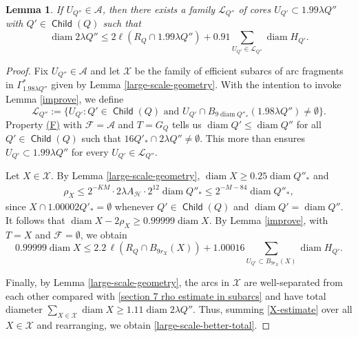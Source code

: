 \documentclass[12pt]{amsart}
\numberwithin{equation}{section}
\theoremstyle{plain}
\newtheorem{lemma}[theorem]{Lemma}
\theoremstyle{definition}
\newcommand{\diam}{\mathop\mathrm{diam}\nolimits}
\newcommand{\Child}{\mathop\mathsf{Child}\nolimits}
\numberwithin{figure}{section}
\begin{document}
\begin{lemma}\label{large-scale-better} If $U_{Q''}\in\mathcal{A}$, then there exists a family $\mathcal{L}_{Q''}$ of cores $U_{Q'}\subset 1.99\lambda Q''$ with $Q'\in\Child(Q)$ such that \begin{equation} \label{large-scale-better-total}
\diam 2\lambda Q'' \leq 2\ell(R_Q\cap 1.99\lambda Q'') + 0.91 \sum_{U_{Q'}\in\mathcal{L}_{Q''}} \diam H_{Q'}.\end{equation}
\end{lemma}

\begin{proof} Fix $U_{Q''}\in\mathcal{A}$ and let $\mathcal{X}$ be the family of efficient subarcs of arc fragments in $\Gamma^*_{1.98\lambda Q''}$ given by Lemma \ref{large-scale-geometry}. With the intention to invoke Lemma \ref{improve}, we define $$\mathcal{L}_{Q''}:=\{U_{Q'}:Q'\in\Child(Q)\text{ and }U_{Q'}\cap B_{9\diam Q''_*}(1.98\lambda Q'')\neq\emptyset\}.$$ Property \hyperref[property-F]{(F)} with $\mathcal{F}=\mathcal{A}$ and $T=G_Q$ tells us $\diam Q'\leq \diam Q''$ for all $Q' \in \Child(Q)$ such that $16Q'_* \cap 2\lambda Q'' \not = \emptyset$. This more than ensures $U_{Q'}\subset 1.99\lambda Q''$ for every $U_{Q'}\in\mathcal{L}_{Q''}$.

Let $X\in\mathcal{X}$. By Lemma \ref{large-scale-geometry}, $\diam X\geq 0.25\diam Q''_*$ and \begin{align}\label{section 7 rho estimate in subarcs}\rho_X\leq 2^{-KM}\cdot 2\lambda A_\mathscr{H} \cdot 2^{12}\diam Q''_* \leq 2^{-M-84}\diam Q''_*,
\end{align} since $X\cap 1.00002Q'_*=\emptyset$ whenever $Q'\in\Child(Q)$ and $\diam Q' = \diam Q''$. It follows that $\diam X-2\rho_X\geq 0.99999\diam X$. By Lemma \ref{improve}, with $T=X$ and $\mathcal{F}=\emptyset$,
we obtain \begin{equation}\label{X-estimate} 0.99999\diam X \leq 2.2\,\ell(R_Q \cap B_{9r_X}(X)) + 1.00016 \sum_{U_{Q'}\subset B_{9r_X}(X)}\diam H_{Q'}.\end{equation}

Finally, by Lemma \ref{large-scale-geometry}, the arcs in $\mathcal{X}$ are well-separated from each other compared with \eqref{section 7 rho estimate in subarcs} and have total diameter $\sum_{X\in\mathcal{X}}\diam X\geq 1.11\diam 2\lambda Q''$. Thus, summing \eqref{X-estimate} over all $X\in\mathcal{X}$ and rearranging, we obtain \eqref{large-scale-better-total}.\end{proof}
\end{document}
